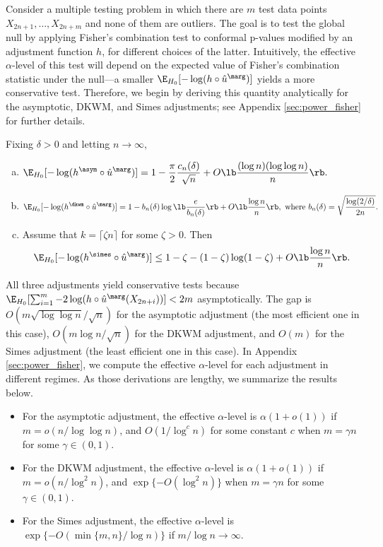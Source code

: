 Consider a multiple testing problem in which there are $m$ test data points $X_{2n+1}, \ldots, X_{2n+m}$ and none of them are outliers. The goal is to test the global null by applying Fisher's combination test to conformal p-values modified by an adjustment function $h$, for different choices of the latter. Intuitively, the effective $\alpha$-level of this test will depend on the expected value of Fisher's combination statistic under the null---a smaller $\E_{H_0}[-\log (h\circ \hat{u}^\marg)]$ yields a more conservative test. Therefore, we begin by deriving this quantity analytically for the asymptotic, DKWM, and Simes adjustments; see Appendix \ref{sec:power_fisher} for further details.
\begin{thm} \label{theorem:fisher-mean}
Fixing $\delta > 0$ and letting $n\rightarrow \infty$,
\begin{enumerate}[(a)]
\item $\displaystyle\E_{H_0}[-\log (h^\asym\circ \hat{u}^\marg)] = 1 - \frac{\pi}{2}\frac{c_n(\delta)}{\sqrt{n}} + O\lb \frac{(\log n)(\log \log n)}{n}\rb.$
\item $\displaystyle\E_{H_0}[-\log (h^\dkwm\circ \hat{u}^\marg)] = 1 - b_n(\delta)\log\lb\frac{e}{b_n(\delta)}\rb + O\lb\frac{\log n}{n}\rb, \,\, \text{where} \,\,b_{n}(\delta) = \sqrt{\frac{\log(2 / \delta)}{2n}}.$
\item   Assume that $k = \lceil\zeta n\rceil$ for some $\zeta > 0$. Then
  \[\E_{H_0}[-\log (h^\simes \circ \hat{u}^\marg)] \le 1 - \zeta - (1 - \zeta)\log (1 - \zeta) + O\lb\frac{\log n}{n}\rb.\]
\end{enumerate}
\end{thm}
All three adjustments yield conservative tests because $\E_{H_0}[\sum_{i=1}^{m}-2\log(h\circ \hat{u}^\marg(X_{2n+i}))] < 2m$ asymptotically. The gap is $O(m\sqrt{\log \log n} / \sqrt{n})$ for the asymptotic adjustment (the most efficient one in this case), $O(m\log n / \sqrt{n})$ for the DKWM adjustment, and $O(m)$ for the Simes adjustment (the least efficient one in this case). In Appendix \ref{sec:power_fisher}, we compute the effective $\alpha$-level for each adjustment in different regimes. As those derivations are lengthy, we summarize the results below.
\begin{itemize}
\item For the asymptotic adjustment, the effective $\alpha$-level is $\alpha(1 + o(1))$ if $m = o(n / \log \log n)$, and $O(1 / \log^c n)$ for some constant $c$ when $m = \gamma n$ for some $\gamma \in (0, 1)$.
\item For the DKWM adjustment, the effective $\alpha$-level is $\alpha(1 + o(1))$ if $m = o(n / \log^2 n)$, and $\exp\{-O(\log^2 n)\}$ when $m = \gamma n$ for some $\gamma \in (0, 1)$.
\item For the Simes adjustment, the effective $\alpha$-level is $\exp\{-O(\min\{m, n\} / \log n)\}$ if $m / \log n\rightarrow \infty$.
\end{itemize}

